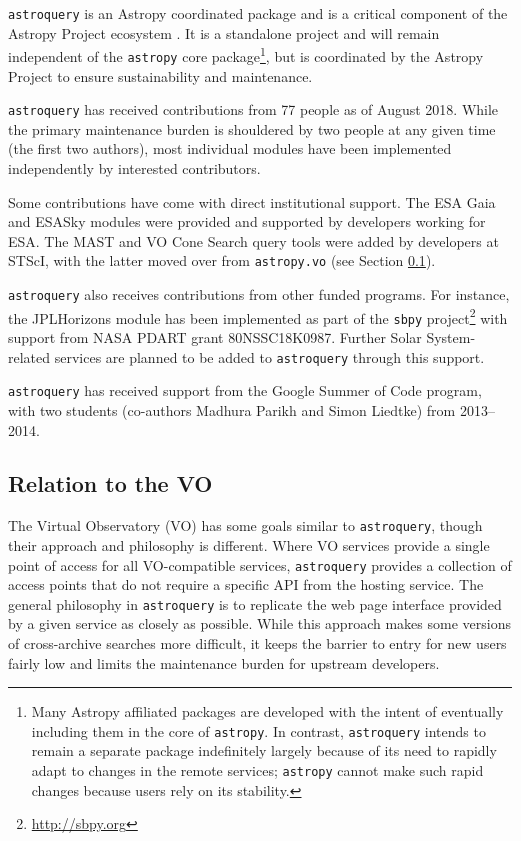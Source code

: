 \documentclass[twocolumn]{aastex62}
\newcommand{\package}[1]{\texttt{#1}\xspace}
\newcommand{\astroquery}{\package{astroquery}}
\newcommand{\astropy}{Astropy\xspace}
\newcommand{\astropypkg}{\package{astropy}}
\begin{document}
\astroquery is an \astropy coordinated package \citep{APE15} and is a critical
component of the \astropy Project ecosystem \citep{Astropy-Collaboration2018}.
It is a standalone project and will remain independent of the \astropypkg core
package\footnote{Many \astropy affiliated packages are developed with the
intent of eventually including them in the core of \astropypkg.  In contrast,
\astroquery intends to remain a separate package indefinitely largely because
of its need to rapidly adapt to changes in the remote services; \astropypkg
cannot make such rapid changes because users rely on its stability.}, but is
coordinated by the \astropy Project to ensure sustainability and maintenance.

\astroquery has received contributions from 77 people as of August 2018.  While the primary maintenance
burden is shouldered by two people at any given time (the first two authors),
most individual modules have been implemented independently by interested
contributors.

Some contributions have come with direct institutional support.  The ESA Gaia and
ESASky modules were provided and supported by developers working for ESA\@.  The
MAST and VO Cone Search query tools were added by developers at STScI, with the
latter moved over from \texttt{astropy.vo} (see Section \ref{sec:vo}).

\astroquery also receives contributions from other funded programs. For instance, the
JPLHorizons module has been implemented as part of the \texttt{sbpy}
project\footnote{\url{http://sbpy.org}} with support from NASA PDART grant
80NSSC18K0987. Further Solar System-related services are planned to be added to
\astroquery through this support.

\astroquery has received support from the Google Summer of Code
program, with two students (co-authors Madhura Parikh and Simon Liedtke)
from 2013--2014.



\subsection{Relation to the VO}
\label{sec:vo}

The Virtual Observatory (VO) has some goals similar to \astroquery,
though their approach and philosophy is different.  Where VO services provide a
single point of access for all VO-compatible services, \astroquery
provides a collection of access points that do not require a specific API from
the hosting service.  The general philosophy in \astroquery is to
replicate the web page interface provided by a given service as closely as
possible.  While this approach makes some versions of cross-archive searches
more difficult, it keeps the barrier to entry for new users fairly low and limits
the maintenance burden for upstream developers.
\end{document}
